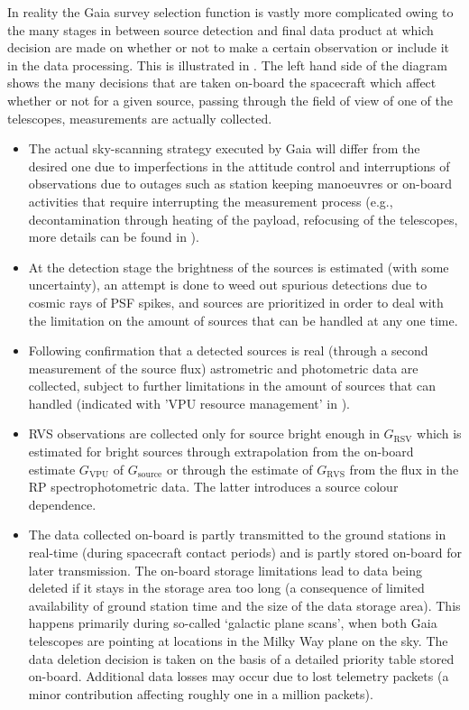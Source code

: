 In reality the Gaia survey selection function is vastly more complicated owing to the many stages in between source detection and final data product at which decision are made on whether or not to make a certain observation or include it in the data processing. This is illustrated in . The left hand side of the diagram shows the many decisions that are taken on-board the spacecraft which affect whether or not for a given source, passing through the field of view of one of the telescopes, measurements are actually collected.
\begin{itemize}
    \item The actual sky-scanning strategy executed by Gaia will differ from the desired one due to imperfections in the attitude control and interruptions of observations due to outages such as station keeping manoeuvres or on-board activities that require interrupting the measurement process (e.g., decontamination through heating of the payload, refocusing of the telescopes, more details can be found in \cite{2016A&A...595A...1G}).
    \item At the detection stage the brightness of the sources is estimated (with some uncertainty), an attempt is done to weed out spurious detections due to cosmic rays of PSF spikes, and sources are prioritized in order to deal with the limitation on the amount of sources that can be handled at any one time.
    \item Following confirmation that a detected sources is real (through a second measurement of the source flux) astrometric and photometric data are collected, subject to further limitations in the amount of sources that can handled (indicated with 'VPU resource management' in ).
    \item RVS observations are collected only for source bright enough in $G_\mathrm{RSV}$ which is estimated for bright sources through extrapolation from the on-board estimate $G_\mathrm{VPU}$ of $G_\mathrm{source}$ or through the estimate of $G_\mathrm{RVS}$ from the flux in the RP spectrophotometric data. The latter introduces a source colour dependence.
    \item The data collected on-board is partly transmitted to the ground stations in real-time (during spacecraft contact periods) and is partly stored on-board for later transmission. The on-board storage limitations lead to data being deleted if it stays in the storage area too long (a consequence of limited availability of ground station time and the size of the data storage area). This happens primarily during so-called `galactic plane scans', when both Gaia telescopes are pointing at locations in the Milky Way plane on the sky. The data deletion decision is taken on the basis of a detailed priority table stored on-board. Additional data losses may occur due to lost telemetry packets (a minor contribution affecting roughly one in a million packets).
\end{itemize}

